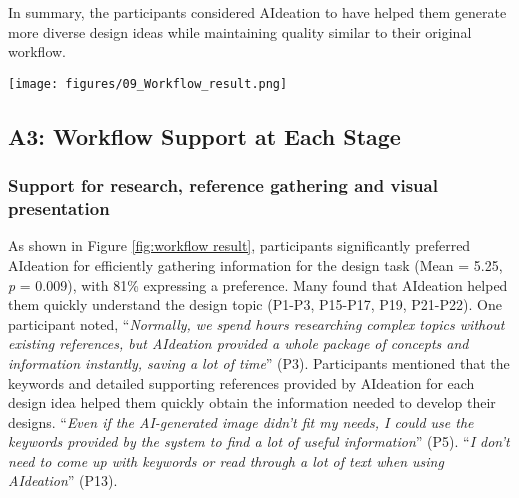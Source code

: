 In summary, the participants considered AIdeation to have helped them generate more diverse design ideas while maintaining quality similar to their original workflow. 

\begin{figure*}
    \centering
    \texttt{[image: figures/09\_Workflow\_result.png]}
    \caption{The distribution of user preference for baseline vs. AIdeation:  Preference rating on a 7-point Likert scale for Workflow Support}
    \label{fig:workflow result}
\end{figure*}

\subsection{A3: Workflow Support at Each Stage}
\subsubsection{Support for research, reference gathering and visual presentation}
As shown in Figure \ref{fig:workflow result}, participants significantly preferred AIdeation for efficiently gathering information for the design task (Mean = 5.25, \textit{p} = 0.009), with 81\% expressing a preference. Many found that AIdeation helped them quickly understand the design topic (P1-P3, P15-P17, P19, P21-P22). One participant noted, “\textit{Normally, we spend hours researching complex topics without existing references, but AIdeation provided a whole package of concepts and information instantly, saving a lot of time}” (P3). Participants mentioned that the keywords and detailed supporting references provided by AIdeation for each design idea helped them quickly obtain the information needed to develop their designs. “\textit{Even if the AI-generated image didn't fit my needs, I could use the keywords provided by the system to find a lot of useful information}” (P5). “\textit{I don’t need to come up with keywords or read through a lot of text when using AIdeation}” (P13).


